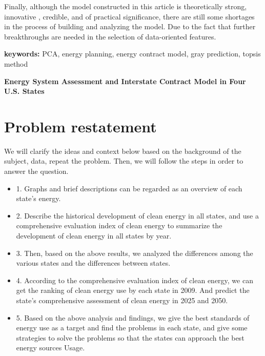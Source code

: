 \documentclass[a4paper]{article}
\begin{document}
Finally, although the model constructed in this article is theoretically strong, innovative , credible, and  of practical significance, there are still some shortages in the process of building and analyzing the model. Due to the fact that further breakthroughs are needed in the selection of data-oriented features.


{\bfseries keywords:} PCA, energy planning, energy contract model, gray prediction, topsis method

\newpage
\thispagestyle{empty}
\setcounter{page}{0}
{\begin{center}\Large \textbf{Energy System Assessment and Interstate Contract Model in Four U.S. States}\end{center}}
\tableofcontents                                                  
\newpage 

\section{Problem restatement}

We will clarify the ideas and context below based on the background of the subject, data, repeat the problem. Then, we will follow the steps in order to answer the question.

\begin{itemize}

\item 1. Graphs and brief descriptions can be regarded as an overview of each state's energy.

\item 2. Describe the historical development of clean energy in all states, and use a comprehensive evaluation index of clean energy to summarize the development of clean energy in all states by year.

\item 3. Then, based on the above results, we analyzed the differences among the various states and the differences between states.

\item 4. According to the comprehensive evaluation index of clean energy, we can get the ranking of clean energy use by each state in 2009. And predict the state's comprehensive assessment of clean energy in 2025 and 2050.

\item 5. Based on the above analysis and findings, we give the best standards of energy use as a target and find the problems in each state, and give some strategies to solve the problems so that the states can approach the best energy sources Usage.

\end{itemize}
\end{document}

